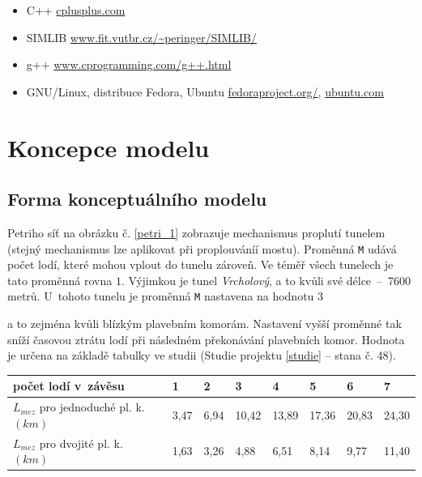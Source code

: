 \documentclass[11pt,a4paper]{article}
\begin{document}
      \begin{itemize}
        \item C++ \href{http://www.cplusplus.com/}{cplusplus.com}
        \item SIMLIB
          \href{http://www.fit.vutbr.cz/~peringer/SIMLIB/}
               {www.fit.vutbr.cz/\textasciitilde peringer/SIMLIB/}
        \item g++ \href{http://www.cprogramming.com/g++.html}
                       {www.cprogramming.com/g++.html}
        \item GNU/Linux, distribuce Fedora, Ubuntu
          \href{http://fedoraproject.org}{fedoraproject.org/},
          \href{http://ubuntu.com}{ubuntu.com}
      \end{itemize}

  \section{Koncepce modelu}

    \subsection{Forma konceptuálního modelu}


      Petriho síť na obrázku č. \ref{petri_1} zobrazuje mechanismus proplutí
      tunelem (stejný mechanismus lze aplikovat při proplouváníí mostu).
      Proměnná \texttt{M} udává počet lodí, které mohou vplout do tunelu zároveň.
      Ve téměř všech tunelech je tato proměnná rovna $1$. Výjimkou je tunel
      \textit{Vrcholový}, a to kvůli své délce \,--\, 7600 metrů. U~tohoto
      tunelu je proměnná \texttt{M} nastavena na hodnotu $3$
      
      a to zejména kvůli blízkým plavebním komorám. Nastavení vyšší proměnné
      tak sníží časovou ztrátu lodí při následném překonávání plavebních komor.
      Hodnota je určena na základě tabulky ve
      studii (Studie projektu \ref{studie} -- stana č. 48).

      \begin{center}
        \begin{tabular}{| l | l | l | l | l | l | l | l |}
          \hline
          počet lodí v~závěsu & 1 & 2 & 3 & 4 & 5 & 6 & 7 \\ \hline
          $L_{mez}$ pro jednoduché pl. k. $(km)$
            & 3,47 & 6,94 & 10,42 & 13,89 & 17,36 & 20,83 & 24,30 \\ \hline
          $L_{mez}$ pro dvojité pl. k. $(km)$
            & 1,63 & 3,26 &  4,88 &  6,51 &  8,14 &  9,77 & 11,40 \\ \hline
          \end{tabular}
      \end{center}
\end{document}
